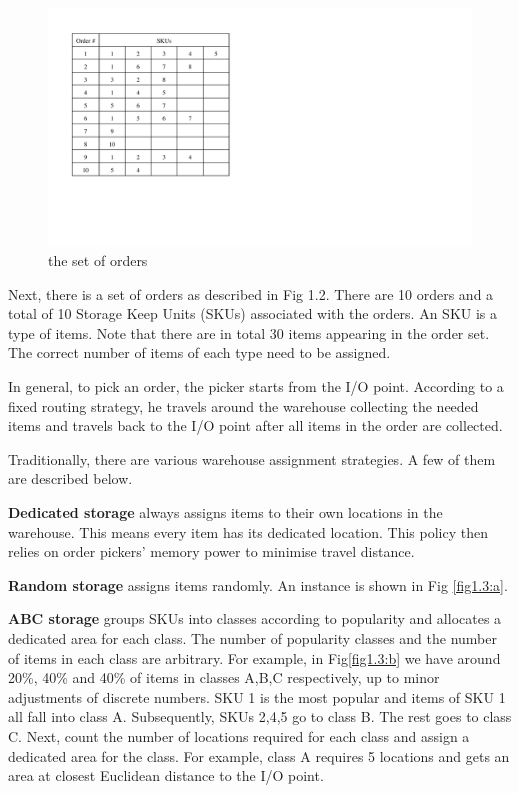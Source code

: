\documentclass[hyp]{socreport}
\begin{document}
\begin{figure}
\includegraphics[scale=0.7]{orders}
\centering
\caption{the set of orders}
\label{fig:orderset}
\end{figure}

Next, there is a set of orders as described in Fig 1.2. There are 10 orders and a total of 10 Storage Keep Units (SKUs) associated with the orders. An SKU is a type of items. Note that there are in total 30 items appearing in the order set. The correct number of items of each type need to be assigned.

In general, to pick an order, the picker starts from the I/O point. According to a fixed routing strategy, he travels around the warehouse collecting the needed items and travels back to the I/O point after all items in the order are collected.

Traditionally, there are various warehouse assignment strategies. A few of them are described below.

\textbf{Dedicated storage} always assigns items to their own locations in the warehouse. This means every item has its dedicated location. This policy then relies on order pickers' memory power to minimise travel distance.

\textbf{Random storage} assigns items randomly. An instance is shown in Fig \ref{fig1.3:a}.

\textbf{ABC storage} groups SKUs into classes according to popularity and allocates a dedicated area for each class. The number of popularity classes and the number of items in each class are arbitrary. For example, in Fig\ref{fig1.3:b} we have around 20\%, 40\% and 40\% of items in classes A,B,C respectively, up to minor adjustments of discrete numbers. SKU 1 is the most popular and items of SKU 1 all fall into class A. Subsequently, SKUs 2,4,5 go to class B. The rest goes to class C. Next, count the number of locations required for each class and assign a dedicated area for the class. For example, class A requires 5 locations and gets an area at closest Euclidean distance to the I/O point.
\end{document}
